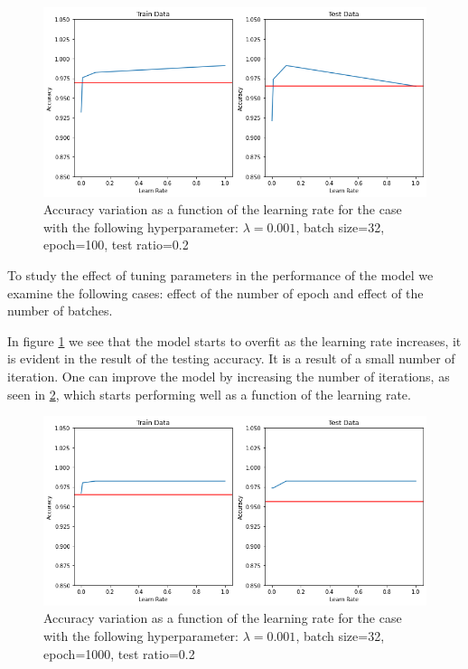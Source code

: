\begin{figure}[H]
    \centering
    \includegraphics[width=1\linewidth]{Images/epoch100.png}
    \caption{Accuracy variation as a function of the learning rate for the case with the following hyperparameter: $\lambda=0.001$, batch size=32, epoch=100, test ratio=0.2}
    \label{fig:epoch100}
\end{figure}

To study the effect of tuning parameters in the performance of the model we examine the following cases: effect of the number of epoch and effect of the number of batches. 

In figure \ref{fig:epoch100} we see that the model starts to overfit as the learning rate increases, it is evident in the result of the testing accuracy. It is a result of a small number of iteration. One can improve the model by increasing the number of iterations, as seen in \ref{fig:epoch1000}, which starts performing well as a function of the learning rate.


\begin{figure}[H]
    \centering
    \includegraphics[width=1\linewidth]{Images/epoch1000.png}
    \caption{Accuracy variation as a function of the learning rate for the case with the following hyperparameter: $\lambda=0.001$, batch size=32, epoch=1000, test ratio=0.2}
    \label{fig:epoch1000}
\end{figure}

